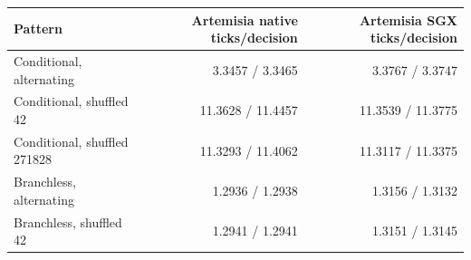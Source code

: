 \begin{tabular}{lrr}
\toprule
Pattern & Artemisia native ticks/decision & Artemisia SGX ticks/decision \\
\midrule
Conditional, alternating & 3.3457 / 3.3465 & 3.3767 / 3.3747 \\
Conditional, shuffled 42 & 11.3628 / 11.4457 & 11.3539 / 11.3775 \\
Conditional, shuffled 271828 & 11.3293 / 11.4062 & 11.3117 / 11.3375 \\
Branchless, alternating & 1.2936 / 1.2938 & 1.3156 / 1.3132 \\
Branchless, shuffled 42 & 1.2941 / 1.2941 & 1.3151 / 1.3145 \\
\bottomrule
\end{tabular}
